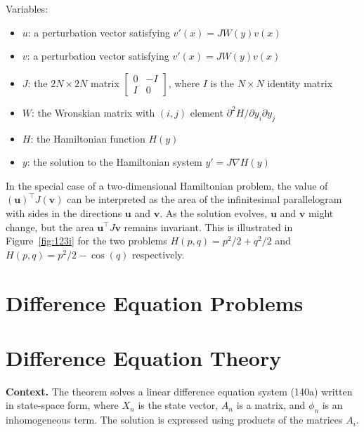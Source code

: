 Variables:
\begin{itemize}
    \item $u$: a perturbation vector satisfying $v'(x) = JW(y)v(x)$
    \item $v$: a perturbation vector satisfying $v'(x) = JW(y)v(x)$
    \item $J$: the $2N \times 2N$ matrix $\begin{bmatrix}0 & -I \\ I & 0\end{bmatrix}$, where $I$ is the $N \times N$ identity matrix
    \item $W$: the Wronskian matrix with $(i, j)$ element $\partial^2 H/\partial y_i \partial y_j$
    \item $H$: the Hamiltonian function $H(y)$
    \item $y$: the solution to the Hamiltonian system $y' = J\nabla H(y)$
\end{itemize}

\begin{theorem}

  \label{thm:123B}
  \uses{}
In the special case of a two-dimensional Hamiltonian problem, the value of \( ( \mathbf{u} )^{\top} J ( \mathbf{v} ) \) can be interpreted as the area of the infinitesimal parallelogram with sides in the directions \( \mathbf{u} \) and \( \mathbf{v} \). As the solution evolves, \( \mathbf{u} \) and \( \mathbf{v} \) might change, but the area \( \mathbf{u}^{\top} J \mathbf{v} \) remains invariant. This is illustrated in Figure~\ref{fig:123i} for the two problems \( H(p, q) = p^{2}/2 + q^{2}/2 \) and \( H(p, q) = p^{2}/2 - \cos(q) \) respectively.
\end{theorem}

\section{Difference Equation Problems}


\section{Difference Equation Theory}

\noindent\textbf{Context.}
The theorem solves a linear difference equation system (140a) written in state-space form, where $X_n$ is the state vector, $A_n$ is a matrix, and $\phi_n$ is an inhomogeneous term. The solution is expressed using products of the matrices $A_i$.

